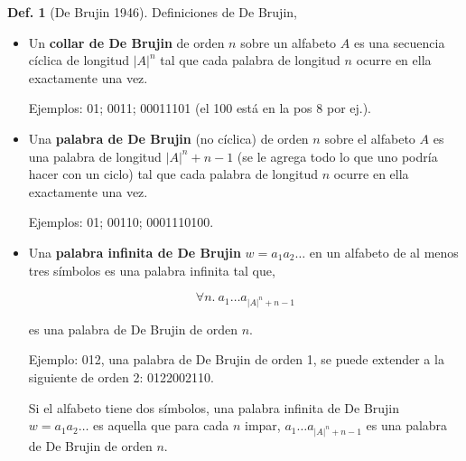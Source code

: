\documentclass{report}
\theoremstyle{definition} %
\newtheorem{definition}{Def.}
\begin{document}
\begin{definition}[De Brujin 1946]
    Definiciones de De Brujin,
    \begin{itemize}
        \item Un \textbf{collar de De Brujin} de orden $n$ sobre un alfabeto $A$
        es una secuencia cíclica de longitud $|A|^n$ tal que cada palabra de
        longitud $n$ ocurre en ella exactamente una vez.

        Ejemplos: 01; 0011; 00011101 (el 100 está en la pos 8 por ej.).

        \item Una \textbf{palabra de De Brujin} (no cíclica) de orden $n$ sobre
        el alfabeto $A$ es una palabra de longitud $|A|^n + n - 1$ (se le agrega
        todo lo que uno podría hacer con un ciclo) tal que cada palabra de
        longitud $n$ ocurre en ella exactamente una vez.

        Ejemplos: 01; 00110; 0001110100.

        \item Una \textbf{palabra infinita de De Brujin} $w = a_1 a_2 \dots$ en
        un alfabeto de al menos tres símbolos es una palabra infinita tal que,

        $$\forall{n}.\ a_1\dots a_{|A|^n + n - 1}$$

        es una palabra de De Brujin de orden $n$.

        Ejemplo: 012, una palabra de De Brujin de orden 1, se puede extender a
        la siguiente de orden 2: 0122002110.

        Si el alfabeto tiene dos símbolos, una palabra infinita de De Brujin $w
        = a_1 a_2 \dots$ es aquella que para cada $n$ impar, $a_1\dots a_{|A|^n
        + n - 1}$ es una palabra de De Brujin de orden $n$.
    \end{itemize}
\end{definition}
\end{document}
